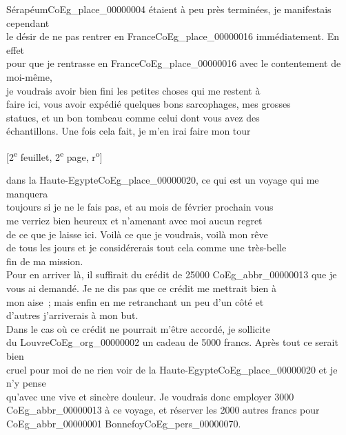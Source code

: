 \documentclass{book}
\begin{document}
Sérapéum\gls{CoEg_place_00000004} étaient à peu près terminées, je manifestais cependant\\
le désir de ne pas rentrer en France\gls{CoEg_place_00000016} immédiatement. En effet\\
pour que je rentrasse en France\gls{CoEg_place_00000016} avec le contentement de moi-même,\\
je voudrais avoir bien fini les petites choses qui me restent à\\
faire ici, vous avoir expédié quelques bons sarcophages, mes grosses\\
statues, et un bon tombeau comme celui dont vous avez des\\
échantillons. Une fois cela fait, je m’en irai faire mon tour
{\footnotesize\begin{center} {[2\textsuperscript{e} feuillet, 2\textsuperscript{e} page, r\textsuperscript{o}]}\end{center}}
\noindent dans la Haute-Egypte\gls{CoEg_place_00000020}, ce qui est un voyage qui me manquera\\
toujours si je ne le fais pas, et au mois de février prochain vous\\
me verriez bien heureux et n’amenant avec moi aucun regret\\
de ce que je laisse ici. Voilà ce que je voudrais, voilà mon rêve\\
de tous les jours et je considérerais tout cela comme une très-belle\\
fin de ma mission.\\
\indent Pour en arriver là, il suffirait du crédit de 25000 \gls{CoEg_abbr_00000013} que je\\
vous ai demandé. Je ne dis pas que ce crédit me mettrait bien à\\
mon aise~; mais enfin en me retranchant un peu d’un côté et\\
d’autres j’arriverais à mon but.\\
\indent Dans le cas où ce crédit ne pourrait m’être accordé, je sollicite\\
du Louvre\gls{CoEg_org_00000002} un cadeau de 5000 francs. Après tout ce serait bien\\
cruel pour moi de ne rien voir de la Haute-Egypte\gls{CoEg_place_00000020} et je n’y pense\\
qu’avec une vive et sincère douleur. Je voudrais donc employer 3000\\
\gls{CoEg_abbr_00000013} à ce voyage, et réserver les 2000 autres francs pour \gls{CoEg_abbr_00000001} Bonnefoy\gls{CoEg_pers_00000070}.\\
\end{document}
